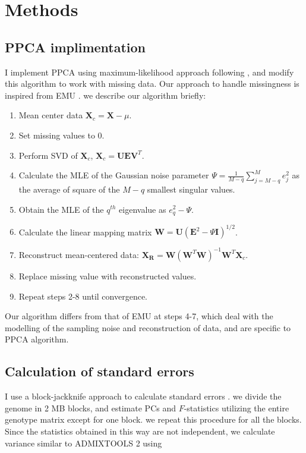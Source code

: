 \documentclass[12pt]{article}
\newcommand{\BW}{\mathbf{W}}
\newcommand{\BI}{\mathbf{I}}
\newcommand{\MX}{\mathbf{X}}
\begin{document}
\section{Methods}\label{ch2_methods}

\subsection{PPCA implimentation}\label{method-ppca}

I implement PPCA using maximum-likelihood approach following \cite{tipping_probabilistic_1999-1}, and modify this algorithm to work with missing data. Our approach to handle missingness is inspired from EMU \citep{meisner_large-scale_2021}. we describe our algorithm briefly:
\begin{enumerate}
    \item Mean center data $\MX_c = \MX - \mu$.
    \item Set missing values to 0.
    \item Perform SVD of $\MX_c$, $\MX_c = \mathbf{UEV}^T$.
    \item Calculate the MLE of the Gaussian noise parameter $\Psi = \frac{1}{M-q} \sum_{j=M-q}^ M e_j^2$ as the average of square of the $M-q$ smallest singular values.
    \item Obtain the MLE of the $q^{th}$ eigenvalue as $e_q^2 - \Psi$.
    \item Calculate the linear mapping matrix $\BW = \mathbf{U} (\mathbf{E}^2 - \Psi\BI)^{1/2}$.
    \item Reconstruct mean-centered data: $\mathbf{X_R} = \BW(\BW^T\BW)^{-1}\BW^T\MX_c$.
    \item Replace missing value with reconstructed values.
    \item Repeat steps 2-8 until convergence.
\end{enumerate}

Our algorithm differs from that of EMU at steps 4-7, which deal with the modelling of the sampling noise and reconstruction of data, and are specific to PPCA algorithm.

\subsection{Calculation of standard errors}

I use a block-jackknife approach to calculate standard errors \citep{kunsch_jackknife_1989, maier_limits_2022, patterson_modication_2020}. we divide the genome in 2 MB blocks, and estimate PCs and $F$-statistics utilizing the entire genotype matrix except for one block. we repeat this procedure for all the blocks. Since the statistics obtained in this way are not independent, we calculate variance similar to ADMIXTOOLS 2 using 
\end{document}
